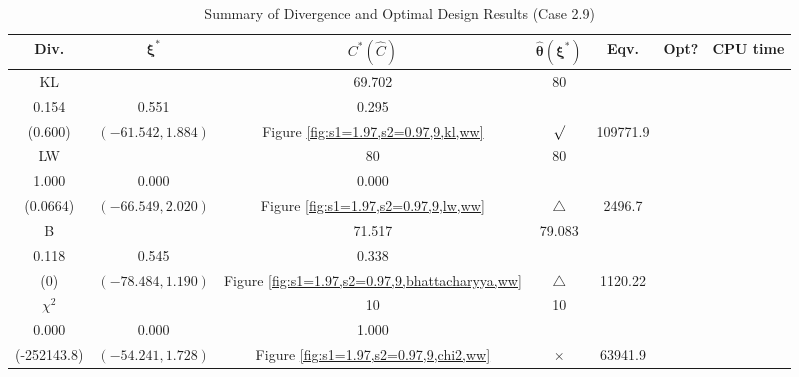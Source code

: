 \documentclass[12pt, a4paper]{article}
\begin{document}
\begin{table}[H]
\centering
\renewcommand{\arraystretch}{1.5} %
\setlength{\tabcolsep}{8pt} %
\begin{tabular}{|c|c|c|c|c|c|c|}
\hline
\textbf{Div.} & \(\boldsymbol{\xi^*}\) & \(C^* (\hat{C})\) & \(\boldsymbol{\hat{\theta}(\xi^*)}\) & \textbf{Eqv.} & \textbf{Opt?} & \textbf{CPU time} \\
\hline
KL & \(\left\{\begin{array}{ccc}
58.678 & 69.702 & 80 \\
0.154 & 0.551 & 0.295
\end{array}\right\}\) &
\(\begin{array}{c}
0.600 \\
(0.600)
\end{array}\) & 
\((-61.542, 1.884)\) & 
Figure \ref{fig:s1=1.97,s2=0.97,9,kl,ww} & $\surd$ & 109771.9 \\
\hline
LW & \(\left\{\begin{array}{ccc}
76.217 & 80 & 80 \\
1.000 & 0.000 & 0.000
\end{array}\right\}\) &
\(\begin{array}{c}
0.693 \\
(0.0664)
\end{array}\) & 
\((-66.549, 2.020)\) & 
Figure \ref{fig:s1=1.97,s2=0.97,9,lw,ww} & $\triangle$ & 2496.7 \\
\hline
B & \(\left\{\begin{array}{ccc}
34.337 & 71.517 & 79.083 \\
0.118 & 0.545 & 0.338
\end{array}\right\}\) &
\(\begin{array}{c}
0 \\
(0)
\end{array}\) & 
\((-78.484, 1.190)\) & 
Figure \ref{fig:s1=1.97,s2=0.97,9,bhattacharyya,ww} & $\triangle$ & 1120.22 \\
\hline
\(\chi^2\) & \(\left\{\begin{array}{ccc}
10 & 10 & 10 \\
0.000 & 0.000 & 1.000
\end{array}\right\}\) &
\(\begin{array}{c}
-29481.35 \\
(-252143.8)
\end{array}\) & 
\((-54.241, 1.728)\) & 
Figure \ref{fig:s1=1.97,s2=0.97,9,chi2,ww} & $\times$ & 63941.9 \\
\hline
\end{tabular}
\caption{Summary of Divergence and Optimal Design Results (Case 2.9)}
\label{tab:results2.9}
\end{table}
\end{document}
